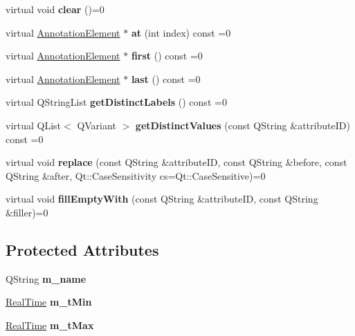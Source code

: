 \begin{DoxyCompactItemize}
virtual void {\bfseries clear} ()=0
\item 
\mbox{\label{class_annotation_tier_ae8c2d7407cb31ec6917aa2e2c711a58c}} 
virtual \hyperlink{class_annotation_element}{Annotation\+Element} $\ast$ {\bfseries at} (int index) const =0
\item 
\mbox{\label{class_annotation_tier_a7501382f881d2956ad172e25a13f4c71}} 
virtual \hyperlink{class_annotation_element}{Annotation\+Element} $\ast$ {\bfseries first} () const =0
\item 
\mbox{\label{class_annotation_tier_aee3de82bbe9757962887068e5e2e10dd}} 
virtual \hyperlink{class_annotation_element}{Annotation\+Element} $\ast$ {\bfseries last} () const =0
\item 
\mbox{\label{class_annotation_tier_a057f6668e07be7e6230955b2c241df1c}} 
virtual Q\+String\+List {\bfseries get\+Distinct\+Labels} () const =0
\item 
\mbox{\label{class_annotation_tier_a1f03d603d941c958c4cf5d0f809305b4}} 
virtual Q\+List$<$ Q\+Variant $>$ {\bfseries get\+Distinct\+Values} (const Q\+String \&attribute\+ID) const =0
\item 
\mbox{\label{class_annotation_tier_a97599d1c53b5ce0b73d5a96cf4fbe872}} 
virtual void {\bfseries replace} (const Q\+String \&attribute\+ID, const Q\+String \&before, const Q\+String \&after, Qt\+::\+Case\+Sensitivity cs=Qt\+::\+Case\+Sensitive)=0
\item 
\mbox{\label{class_annotation_tier_aa0c5186b64e95e2c54070f9e7dc73cae}} 
virtual void {\bfseries fill\+Empty\+With} (const Q\+String \&attribute\+ID, const Q\+String \&filler)=0
\end{DoxyCompactItemize}
\subsection*{Protected Attributes}
\begin{DoxyCompactItemize}
\item 
\mbox{\label{class_annotation_tier_a24cca2a0647ac26993600fc1340f542d}} 
Q\+String {\bfseries m\+\_\+name}
\item 
\mbox{\label{class_annotation_tier_afcca9fbd63e626e84490f7c95d71e09b}} 
\hyperlink{struct_real_time}{Real\+Time} {\bfseries m\+\_\+t\+Min}
\item 
\mbox{\label{class_annotation_tier_a05d59926099e9a3d45d18a84934b745c}} 
\hyperlink{struct_real_time}{Real\+Time} {\bfseries m\+\_\+t\+Max}
\end{DoxyCompactItemize}
